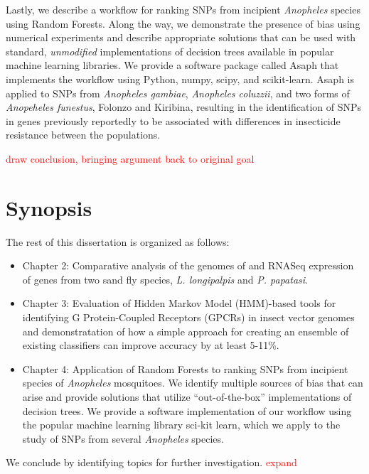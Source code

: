 Lastly, we describe a workflow for ranking SNPs from incipient \emph{Anopheles} species using Random Forests.  Along the way, we demonstrate the presence of bias using numerical experiments and describe appropriate solutions that can be used with standard, \emph{unmodified} implementations of decision trees available in popular machine learning libraries. We provide a software package called Asaph that implements the workflow using Python, numpy, scipy, and scikit-learn.  Asaph is applied to SNPs from \emph{Anopheles gambiae}, \emph{Anopheles coluzzii}, and two forms of \emph{Anopeheles funestus}, Folonzo and Kiribina, resulting in the identification of SNPs in genes previously reportedly to be associated with differences in insecticide resistance between the populations.

\textcolor{red}{draw conclusion, bringing argument back to original goal}

\section{Synopsis}
The rest of this dissertation is organized as follows:

\begin{itemize}
\item Chapter 2: Comparative analysis of the genomes of and RNASeq expression of genes from two sand fly species, \emph{L. longipalpis} and \emph{P. papatasi}.
\item Chapter 3: Evaluation of Hidden Markov Model (HMM)-based tools for identifying G Protein-Coupled Receptors (GPCRs) in insect vector genomes and demonstratation of how a simple approach for creating an ensemble of existing classifiers can improve accuracy by at least 5-11\%.
\item Chapter 4: Application of Random Forests to ranking SNPs from incipient species of \emph{Anopheles} mosquitoes.  We identify multiple sources of bias that can arise and provide solutions that utilize ``out-of-the-box'' implementations of decision trees.  We provide a software implementation of our workflow using the popular machine learning library sci-kit learn, which we apply to the study of SNPs from several \emph{Anopheles} species.
\end{itemize}

We conclude by identifying topics for further investigation. \textcolor{red}{expand}
